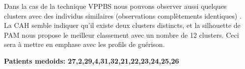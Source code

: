 %
Dans la cas de la technique VPPBS nous pouvons observer aussi quelques clusters avec des individus similaires (observations complètements identiques) . La CAH semble indiquer qu’il existe   deux clusters distincts, et la silhouette de PAM nous propose le meilleur classement avec un nombre de 12 clusters. Ceci sera à mettre en emphase avec les profils de guérison. 

\textbf{Patients medoids: 27,2,29,4,31,32,21,22,23,24,25,26}
